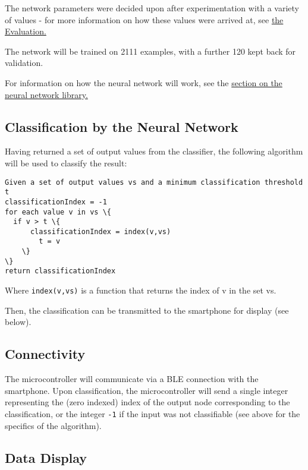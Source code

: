 \documentclass[a4paper]{article}
\begin{document}
The network parameters were decided upon after experimentation with a variety of values - for more information on how these values were arrived at, see \hyperref[subsubsec:ev_cp_parameterchoiceprocess]{the Evaluation.}

The network will be trained on 2111 examples, with a further 120 kept back for validation.

For information on how the neural network will work, see the \hyperref[sec:dn]{section on the neural network library.}

\subsection{Classification by the Neural Network}%
\label{subsec:dc_classification}

Having returned a set of output values from the classifier, the following algorithm will be used to classify the result:

\begin{lstlisting}
Given a set of output values vs and a minimum classification threshold t
classificationIndex = -1
for each value v in vs \{
  if v > t \{
      classificationIndex = index(v,vs)
        t = v
    \}
\}
return classificationIndex
\end{lstlisting}

Where \lstinline{index(v,vs)} is a function that returns the index of v in the set vs.

Then, the classification can be transmitted to the smartphone for display (see below).

\subsection{Connectivity}%
\label{subsec:dc_connectivity}

The microcontroller will communicate via a BLE connection with the smartphone. Upon classification, the microcontroller will send a single integer representing the (zero indexed) index of the output node corresponding to the classification, or the integer \lstinline{-1} if the input was not classifiable (see above for the specifics of the algorithm).

\subsection{Data Display}%
\label{subsec:dc_datadisplay}
\end{document}
